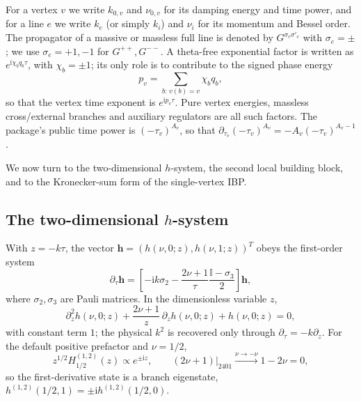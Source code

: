 \documentclass[11pt,a4paper]{article}
\newcommand{\ii}{\mathrm i}
\newcommand{\Id}{\mathbb I}
\begin{document}
For a vertex $v$ we write $k_{0,v}$ and $\nu_{0,v}$ for its damping energy and time power, and for a
line $e$ we write $k_e$ (or simply $k_i$) and $\nu_i$ for its momentum and Bessel order. The
propagator of a massive or massless full line is denoted by $G^{\sigma_e\sigma'_e}$ with
$\sigma_e=\pm$; we use $\sigma_e=+1,-1$ for $G^{++},G^{--}$. A theta-free exponential factor is
written as $e^{\ii\chi_bq_b\tau}$, with $\chi_b=\pm1$; its only role is to contribute to the signed
phase energy
\begin{equation}
  p_v=\sum_{b:\,v(b)=v}\chi_bq_b,
  \label{eq:vertex-phase-energy}
\end{equation}
so that the vertex time exponent is $e^{\ii p_v\tau}$. Pure vertex energies, massless cross/external
branches and auxiliary regulators are all such factors. The package's public time power is
$(-\tau_v)^{A_v}$, so that $\partial_{\tau_v}(-\tau_v)^{A_v}=-A_v(-\tau_v)^{A_v-1}$.

We now turn to the two-dimensional $h$-system, the second local building block, and to the
Kronecker-sum form of the single-vertex IBP.

\subsection{The two-dimensional $h$-system}

With $z=-k\tau$, the vector $\bm h=(h(\nu,0;z),h(\nu,1;z))^T$ obeys the first-order system
\begin{equation}
  \partial_\tau\bm h
  =\left[-\ii k\sigma_2-\frac{2\nu+1}{\tau}\frac{\Id-\sigma_3}{2}\right]\bm h,
  \label{eq:h-first-order-system}
\end{equation}
where $\sigma_2,\sigma_3$ are Pauli matrices. In the dimensionless variable $z$,
\begin{equation}
  \partial_z^2h(\nu,0;z)+\frac{2\nu+1}{z}\,\partial_zh(\nu,0;z)+h(\nu,0;z)=0,
  \label{eq:h-dimensionless-eom}
\end{equation}
with constant term $1$; the physical $k^2$ is recovered only through $\partial_\tau=-k\partial_z$.
For the default positive prefactor and $\nu=1/2$,
\begin{equation}
  z^{1/2}H_{1/2}^{(1,2)}(z)\propto e^{\pm\ii z},
  \qquad
  (2\nu+1)\big|_{2401}\xrightarrow{\nu\to-\nu}1-2\nu=0,
  \label{eq:massless-h-eigenstate}
\end{equation}
so the first-derivative state is a branch eigenstate, $h^{(1,2)}(1/2,1)=\pm\ii h^{(1,2)}(1/2,0)$.
\end{document}
